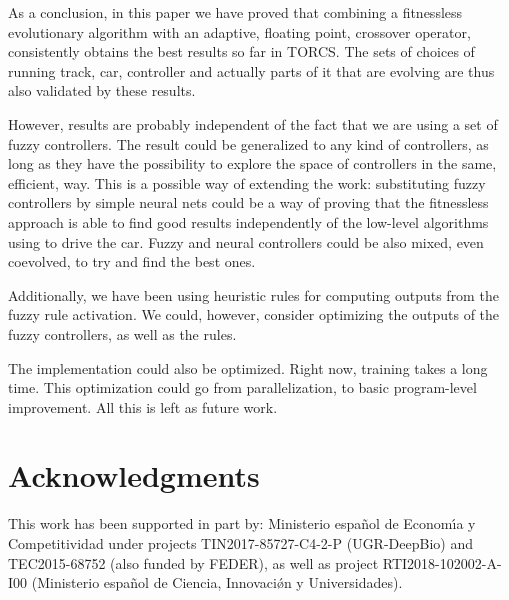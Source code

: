 \documentclass[10pt,journal,compsoc]{IEEEtran}
\begin{document}
As a conclusion, in this paper we have proved that combining a
fitnessless evolutionary algorithm with an adaptive, floating point,
crossover operator, consistently obtains the best results so far in
TORCS. The sets of choices of running track, car, controller and
actually parts of it that are evolving are thus also validated by
these results.

However, results are probably independent of the fact that we are using a
set of fuzzy controllers. The result could be generalized to any kind
of controllers, as long as they have the possibility to explore the
space of controllers in the same, efficient, way. This is a possible
way of extending the work: substituting fuzzy controllers by simple
neural nets could be a way of proving that the fitnessless approach
is able to find good results independently of the low-level algorithms
using to drive the car. Fuzzy and neural controllers could be also
mixed, even coevolved, to try and find the best ones. 

Additionally, we have been using heuristic rules for computing outputs
from the fuzzy rule activation. We could, however, consider optimizing
the outputs of the fuzzy controllers, as well as the rules.

The implementation could also be optimized. Right now, training takes
a long time. This optimization could go from parallelization, to basic
program-level improvement. All this is left as future work.



\section*{Acknowledgments}

This work has been supported in part by: Ministerio espa\~{n}ol de
Econom\'{\i}a y Competitividad under projects  TIN2017-85727-C4-2-P (UGR-DeepBio) and TEC2015-68752 (also funded by FEDER), as well as project RTI2018-102002-A-I00 (Ministerio espa\~{n}ol de Ciencia, Innovaci\'{\o}n y Universidades).












\end{document}
